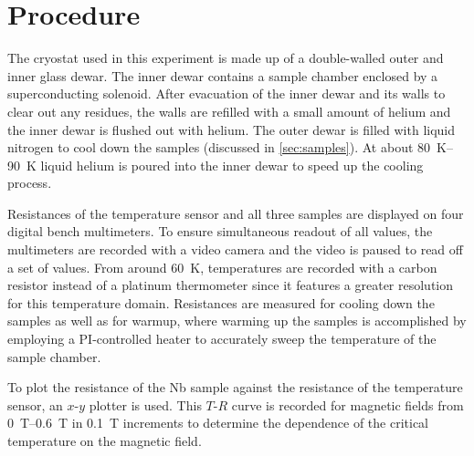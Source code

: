 \chapter{Procedure}
The cryostat used in this experiment is made up of a double-walled outer and inner glass dewar.
The inner dewar contains a sample chamber enclosed by a superconducting solenoid.
After evacuation of the inner dewar and its walls to clear out any residues, the walls are refilled with a small amount of helium and the inner dewar is flushed out with helium.
The outer dewar is filled with liquid nitrogen to cool down the samples (discussed in \autoref{sec:samples}).
At about \SIrange{80}{90}{\kelvin} liquid helium is poured into the inner dewar to speed up the cooling process.

Resistances of the temperature sensor and all three samples are displayed on four digital bench multimeters.
To ensure simultaneous readout of all values, the multimeters are recorded with a video camera and the video is paused to read off a set of values.
From around \SI{60}{\kelvin}, temperatures are recorded with a carbon resistor instead of a platinum thermometer since it features a greater resolution for this temperature domain.
Resistances are measured for cooling down the samples as well as for warmup, where warming up the samples is accomplished by employing a PI-controlled heater to accurately sweep the temperature of the sample chamber.

To plot the resistance of the Nb sample against the resistance of the temperature sensor, an $x$-$y$ plotter is used.
This $T$-$R$ curve is recorded for magnetic fields from \SIrange{0}{0.6}{\tesla} in \SI{0.1}{\tesla} increments to determine the dependence of the critical temperature on the magnetic field.
